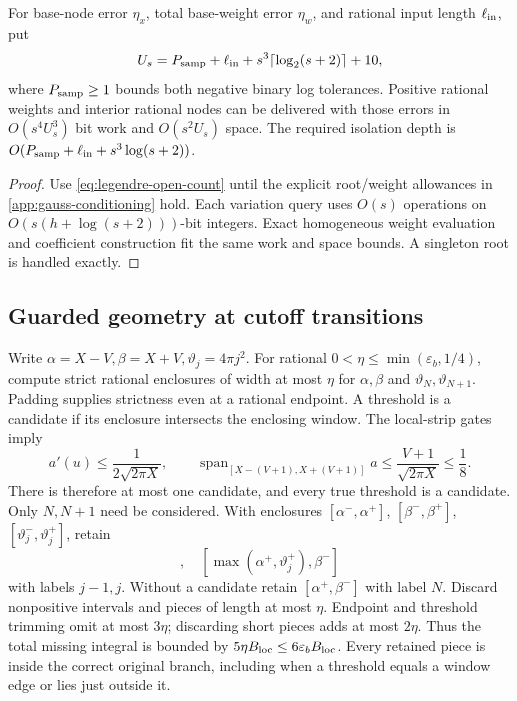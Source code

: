 \begin{proposition}\label{prop:gauss-provider}
For base-node error \(\eta_x\), total base-weight error \(\eta_w\),
and rational input length \(\ell_{\rm in}\), put
\[
 U_s=P_{\rm samp}+\ell_{\rm in}
                 +s^3\lceil\log_2(s+2)\rceil+10,
\]
where \(P_{\rm samp}\ge1\) bounds both negative binary log tolerances.
Positive rational weights and interior rational nodes can be delivered
with those errors in \(O(s^4U_s^3)\) bit work and \(O(s^2U_s)\) space.
The required isolation depth is
\(O(P_{\rm samp}+\ell_{\rm in}+s^3\log(s+2))\).
\end{proposition}
\begin{proof}
Use \eqref{eq:legendre-open-count} until the explicit root/weight
allowances in \cref{app:gauss-conditioning} hold. Each variation query
uses \(O(s)\) operations on \(O(s(h+\log(s+2)))\)-bit integers.
Exact homogeneous weight evaluation and coefficient construction fit
the same work and space bounds. A singleton root is handled exactly.
\end{proof}

\subsection{Guarded geometry at cutoff transitions}
\label{subsec:guard-geometry}
Write \(\alpha=X-V,\beta=X+V,\vartheta_j=4\pi j^2\).
For rational \(0<\eta\le\min(\varepsilon_b,1/4)\), compute strict
rational enclosures of width at most \(\eta\) for \(\alpha,\beta\)
and \(\vartheta_N,\vartheta_{N+1}\). Padding supplies strictness even
at a rational endpoint. A threshold is a candidate if its enclosure
intersects the enclosing window. The local-strip gates imply
\[
 a'(u)\le\frac1{2\sqrt{2\pi X}},\qquad
 \operatorname{span}_{[X-(V+1),X+(V+1)]}a
 \le\frac{V+1}{\sqrt{2\pi X}}\le\frac18.
\]
There is therefore at most one candidate, and every true threshold
is a candidate. Only \(N,N+1\) need be considered.
With enclosures \([\alpha^-,\alpha^+]\), \([\beta^-,\beta^+]\),
\([\vartheta_j^-,\vartheta_j^+]\), retain
\begin{equation}
 [\alpha^+,\min(\beta^-,\vartheta_j^-)],\quad
 [\max(\alpha^+,\vartheta_j^+),\beta^-]
 \label{eq:interior-branches}
\end{equation}
with labels \(j-1,j\). Without a candidate retain
\([\alpha^+,\beta^-]\) with label \(N\).
Discard nonpositive intervals and pieces of length at most \(\eta\).
Endpoint and threshold trimming omit at most \(3\eta\); discarding
short pieces adds at most \(2\eta\). Thus the total missing integral
is bounded by \(5\eta B_{\rm loc}\le6\varepsilon_b B_{\rm loc}\).
Every retained piece is inside the correct original branch, including
when a threshold equals a window edge or lies just outside it.

